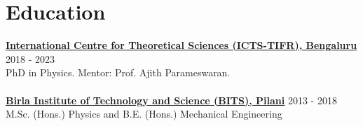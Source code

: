 			
			
			
			
		
		\section{Education}
		\textbf{\href{https://www.icts.res.in/}{International Centre for Theoretical Sciences (ICTS-TIFR), Bengaluru}} \hfill 2018 - 2023\\
            PhD in Physics. {Mentor: Prof. Ajith Parameswaran}.\\
             \\
            \textbf{\href{http://www.bits-pilani.ac.in/}{Birla Institute of Technology and Science (BITS), Pilani}} \hfill 2013 - 2018\\
		{M.Sc. (Hons.) Physics and B.E. (Hons.) Mechanical Engineering}

